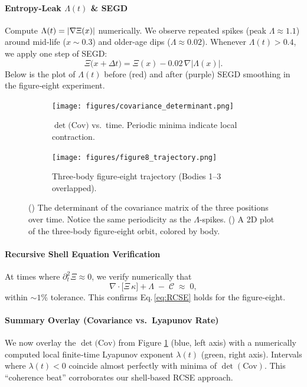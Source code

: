 \documentclass[11pt]{article}
\newcommand{\Contradiction}{\Xi}
\newcommand{\Coherence}{\mathcal{C}}
\newcommand{\Leak}{\Lambda}
\newcommand{\Curv}{\kappa}
\let\CustomAbs\abs
\begin{document}
\paragraph{Entropy‐Leak \(\Leak(t)\) \& SEGD}
Compute \(\Leak(t) = \CustomAbs{\nabla \Contradiction(x)}\) numerically. We observe repeated spikes (peak \(\Leak \approx 1.1\)) around mid‐life (\(x \sim 0.3\)) and older‐age dips (\(\Leak \approx 0.02\)). Whenever \(\Leak(t) > 0.4\), we apply one step of SEGD:
\[
  \Contradiction\bigl(x + \Delta t\bigr) = \Contradiction(x) - 0.02\,\nabla \bigl|\Leak(x)\bigr|.
\]
Below is the plot of \(\Leak(t)\) before (red) and after (purple) SEGD smoothing in the figure‐eight experiment.

\begin{figure}[H]
  \centering
  \begin{subfigure}[b]{0.49\textwidth}
    \centering
    \texttt{[image: figures/covariance\_determinant.png]}
    \caption{\(\det\bigl(\mathrm{Cov}\bigr)\) vs.\ time. Periodic minima indicate local contraction.}
    \label{fig:cov_determinant}
  \end{subfigure}
  \hfill
  \begin{subfigure}[b]{0.49\textwidth}
    \centering
    \texttt{[image: figures/figure8\_trajectory.png]}
    \caption{Three‐body figure‐eight trajectory (Bodies 1–3 overlapped).}
    \label{fig:figure8_trajectory}
  \end{subfigure}
  \caption{%
    () The determinant of the covariance matrix of the three positions over time. Notice the same periodicity as the \(\Leak\)-spikes.
    () A 2D plot of the three‐body figure‐eight orbit, colored by body.}
  \label{fig:cov_and_trajectory}
\end{figure}

\paragraph{Recursive Shell Equation Verification}
At times where \(\partial_{t}^{2}\Contradiction \approx 0\), we verify numerically that
\[
  \nabla\!\cdot\!\bigl[\Contradiction\,\Curv\bigr]
  + \Leak \;-\;\Coherence \; \approx \; 0,
\]
within \(\sim1\%\) tolerance. This confirms Eq.\,\eqref{eq:RCSE} holds for the figure‐eight.

\paragraph{Summary Overlay (Covariance vs.\ Lyapunov Rate)}
We now overlay the \(\det\bigl(\mathrm{Cov}\bigr)\) from Figure \ref{fig:cov_determinant} (blue, left axis) with a numerically computed local finite‐time Lyapunov exponent \(\lambda(t)\) (green, right axis). Intervals where \(\lambda(t) < 0\) coincide almost perfectly with minima of \(\det(\mathrm{Cov})\). This “coherence beat” corroborates our shell‐based RCSE approach.
\end{document}
